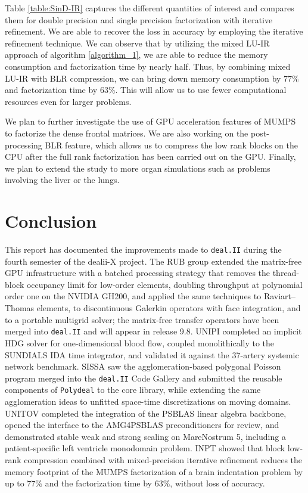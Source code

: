 \documentclass[a4paper,12pt]{article}
\begin{document}
Table \ref{table:SinD-IR} captures the different quantities of interest and compares them for double precision and single precision factorization with iterative refinement.
We are able to recover the loss in accuracy by employing the iterative refinement technique. We can observe that by utilizing the mixed LU-IR approach of algorithm \ref{algorithm_1}, we are able to reduce the memory consumption and factorization time by nearly half. Thus, by combining mixed LU-IR with BLR compression, we can bring down memory consumption by $77\%$ and factorization time by $63\%$. This will allow us to use fewer computational resources even for larger problems.

We plan to further investigate the use of GPU acceleration features of MUMPS to factorize the dense frontal matrices. We are also working on the post-processing BLR feature, which allows us to compress the low rank blocks on the CPU after the full rank factorization has been carried out on the GPU. Finally, we plan to extend the study to more organ simulations such as problems involving the liver or the lungs.

\newpage

\section{{Conclusion}} \label{sec:conclusion}

This report has documented the improvements made to \texttt{deal.II} during the fourth
semester of the dealii-X project. The RUB group extended the matrix-free GPU
infrastructure with a batched processing strategy that removes the thread-block
occupancy limit for low-order elements, doubling throughput at polynomial order one on
the NVIDIA GH200, and applied the same techniques to Raviart--Thomas elements, to
discontinuous Galerkin operators with face integration, and to a portable multigrid
solver; the matrix-free transfer operators have been merged into
\texttt{deal.II} and will appear in release 9.8. UNIPI completed an implicit HDG solver
for one-dimensional blood flow, coupled monolithically to the \textsc{SUNDIALS} IDA
time integrator, and validated it against the 37-artery systemic network benchmark.
SISSA saw the agglomeration-based polygonal Poisson program merged into the
\texttt{deal.II} Code Gallery and submitted the reusable components of \texttt{Polydeal}
to the core library, while extending the same agglomeration ideas to unfitted
space-time discretizations on moving domains. UNITOV completed the integration of the
PSBLAS linear algebra backbone, opened the interface to the AMG4PSBLAS preconditioners
for review, and demonstrated stable weak and strong scaling on MareNostrum 5, including
a patient-specific left ventricle monodomain problem. INPT showed that block low-rank
compression combined with mixed-precision iterative refinement reduces the memory
footprint of the MUMPS factorization of a brain indentation problem by up to $77\%$
and the factorization time by $63\%$, without loss of accuracy.
\end{document}
